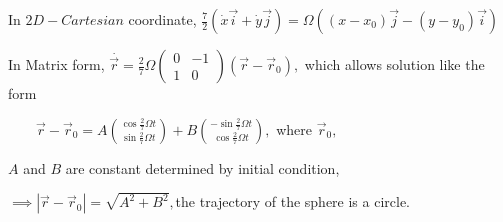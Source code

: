 \documentclass{article}
\begin{document}
In $2D-Cartesian$ coordinate, $\frac{7}{2}\left( \dot{x}\vec{i}+\dot{y}\vec{j%
}\right) =\Omega \left( \left( x-x_{0}\right) \vec{j}-\left( y-y_{0}\right) 
\vec{i}\right) $

In Matrix form, $\overset{\cdot }{\vec{r}}=\frac{2}{7}\Omega 
\begin{pmatrix}
0 & -1 \\ 
1 & 0%
\end{pmatrix}%
\left( \vec{r}-\vec{r}_{0}\right) ,$ which allows solution like the form

$\qquad \vec{r}-\vec{r}_{0}=A\binom{\cos \frac{2}{7}\Omega t}{\sin \frac{2}{7%
}\Omega t}+B\binom{-\sin \frac{2}{7}\Omega t}{\cos \frac{2}{7}\Omega t},$%
where $\vec{r}_{0},$

$A$ and $B$ are constant determined by initial condition, 

$\implies \left\vert \vec{r}-\vec{r}_{0}\right\vert =\sqrt{A^{2}+B^{2}},$the
trajectory of the sphere is a circle.
\end{document}
